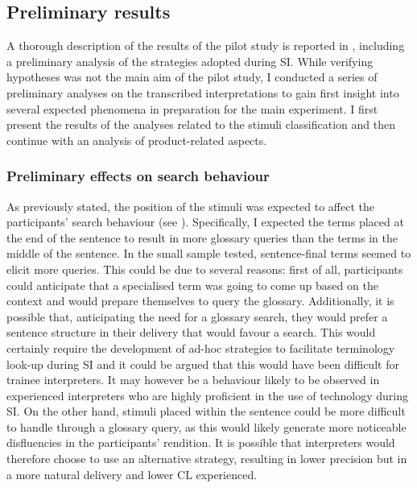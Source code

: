 \subsection{Preliminary results} \label{results_PS}
A thorough description of the results of the pilot study is reported in \citet{prandi_designing_2017, prandi_exploratory_2018}, including a preliminary analysis of the strategies adopted during SI. While verifying hypotheses was not the main aim of the pilot study, I conducted a series of preliminary analyses on the transcribed interpretations to gain first insight into several expected phenomena in preparation for the main experiment. I first present the results of the analyses related to the stimuli classification and then continue with an analysis of product-related aspects.


\subsubsection{Preliminary effects on search behaviour} \label{searchbehaviourPS}
As previously stated, the position of the stimuli was expected to affect the participants' search behaviour (see ). Specifically, I expected the terms placed at the end of the sentence to result in more glossary queries than the terms in the middle of the sentence. In the small sample tested, sentence-final terms seemed to elicit more queries. This could be due to several reasons: first of all, participants could anticipate that a specialised term was going to come up based on the context and would prepare themselves to query the glossary. Additionally, it is possible that, anticipating the need for a glossary search, they would prefer a sentence structure in their delivery that would favour a search. This would certainly require the development of ad-hoc strategies to facilitate terminology look-up during SI and it could be argued that this would have been difficult for trainee interpreters. It may however be a behaviour likely to be observed in experienced interpreters who are highly proficient in the use of technology during SI. On the other hand, stimuli placed within the sentence could be more difficult to handle through a glossary query, as this would likely generate more noticeable disfluencies in the participants' rendition. It is possible that interpreters would therefore choose to use an alternative strategy, resulting in lower precision but in a more natural delivery and lower CL experienced.

